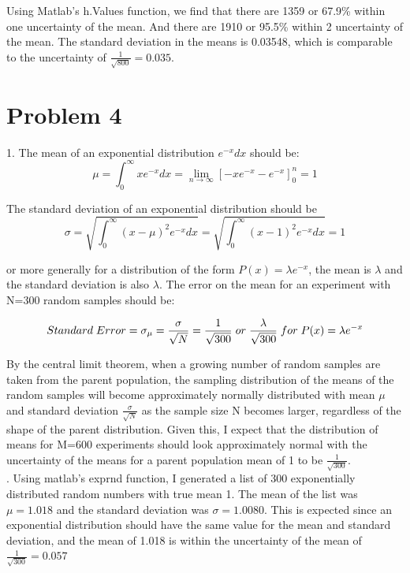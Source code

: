 \documentclass{article}
\begin{document}
  Using Matlab’s h.Values function, we find that there are 1359 or 67.9\% within one uncertainty of the mean. And there are 1910 or 95.5\% within 2 uncertainty of the mean. The standard deviation in the means is 0.03548, which is comparable to the uncertainty of $\frac{1}{\sqrt{800}}=0.035$. 
  
\section*{Problem 4}
1. The mean of an exponential distribution $e^{-x}dx$ should be:
\[ \mu=\int_{0}^{\infty} xe^{-x} dx=\lim_{n\to \infty}[-xe^{-x}-e^{-x}]^n_0=1\] 

\noindent The standard deviation of an exponential distribution should be 
\[ \sigma=\sqrt{\int_{0}^{\infty} (x-\mu)^2e^{-x} dx}=\sqrt{\int_{0}^{\infty} (x-1)^2e^{-x} dx}=1\] 

\noindent or more generally for a distribution of the form $P(x)=\lambda e^{-x}$, the mean is $\lambda$ and the standard deviation is also $\lambda$. The error on the mean for an experiment with N=300 random samples should be:

\[ Standard\hspace{1mm}Error=\sigma_{\mu}=\frac{\sigma}{\sqrt{N}}=\frac{1}{\sqrt{300}}\hspace{1mm}or\hspace{1mm}\frac{\lambda}{\sqrt{300}}\hspace{1mm}for\hspace{1mm}P(x)=\lambda e^{-x} \] 

By the central limit theorem, when a growing number of random samples are taken from the parent population, the sampling distribution of the means of the random samples will become approximately normally distributed with mean $\mu$ and standard deviation $\frac{\sigma}{\sqrt{ N}}$ as the sample size N becomes larger, regardless of the shape of the parent distribution. Given this, I expect that the distribution of means for M=600 experiments should look approximately normal with the uncertainty of the means for a parent population mean of 1 to be $\frac{1}{\sqrt{300}}$.  \\


. Using matlab's exprnd function, I generated a list of 300 exponentially distributed random numbers with true mean 1. The mean of the list was $\mu=1.018$ and the standard deviation was $\sigma=1.0080$. This is expected since an exponential distribution should have the same value for the mean and standard deviation, and the mean of 1.018 is within the uncertainty of the mean of $\frac{1}{\sqrt{300}}=0.057$  \newline
\end{document}
